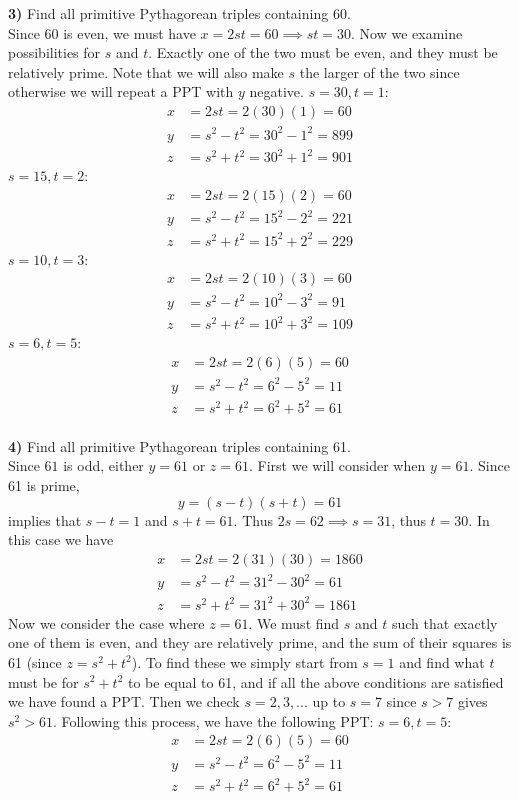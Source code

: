 \documentclass{scrartcl}
\begin{document}
\textbf{3)} Find all primitive Pythagorean triples containing 60.\\

Since 60 is even, we must have $x=2st=60\implies st=30$. Now we examine possibilities for $s$ and $t$. Exactly one of the two must be even, and they must be relatively prime. Note that we will also make $s$ the larger of the two since otherwise we will repeat a PPT with $y$ negative.
$s=30, t=1$:
\begin{align*}
  x &= 2st = 2(30)(1) = 60\\
  y &= s^2-t^2 = 30^2 - 1^2 = 899\\
  z &= s^2+t^2 = 30^2 + 1^2 = 901
\end{align*}
$s=15, t=2$:
\begin{align*}
  x &= 2st = 2(15)(2) = 60\\
  y &= s^2-t^2 = 15^2 - 2^2 = 221\\
  z &= s^2+t^2 = 15^2 + 2^2 = 229
\end{align*}
$s=10, t=3$:
\begin{align*}
  x &= 2st = 2(10)(3) = 60\\
  y &= s^2-t^2 = 10^2 - 3^2 = 91\\
  z &= s^2+t^2 = 10^2 + 3^2 = 109
\end{align*}
$s=6, t=5$:
\begin{align*}
  x &= 2st = 2(6)(5) = 60\\
  y &= s^2-t^2 = 6^2 - 5^2 = 11\\
  z &= s^2+t^2 = 6^2 + 5^2 = 61
\end{align*}\\

\textbf{4)} Find all primitive Pythagorean triples containing 61.\\

Since $61$ is odd, either $y=61$ or $z=61$. First we will consider when $y=61$. Since 61 is prime, $$y=(s-t)(s+t)=61$$ implies that $s-t=1$ and $s+t=61$. Thus $2s=62\implies s=31$, thus $t=30$. In this case we have
\begin{align*}
  x &= 2st = 2(31)(30) = 1860\\
  y &= s^2-t^2 = 31^2 - 30^2 = 61\\
  z &= s^2+t^2 = 31^2 + 30^2 = 1861
\end{align*}
Now we consider the case where $z=61$. We must find $s$ and $t$ such that exactly one of them is even, and they are relatively prime, and the sum of their squares is 61 (since $z=s^2+t^2$). To find these we simply start from $s=1$ and find what $t$ must be for $s^2+t^2$ to be equal to 61, and if all the above conditions are satisfied we have found a PPT. Then we check $s=2,3,...$ up to $s=7$ since $s>7$ gives $s^2>61$. Following this process, we have the following PPT:
$s=6, t=5$:
\begin{align*}
  x &= 2st = 2(6)(5) = 60\\
  y &= s^2-t^2 = 6^2 - 5^2 = 11\\
  z &= s^2+t^2 = 6^2 + 5^2 = 61
\end{align*}
\end{document}
